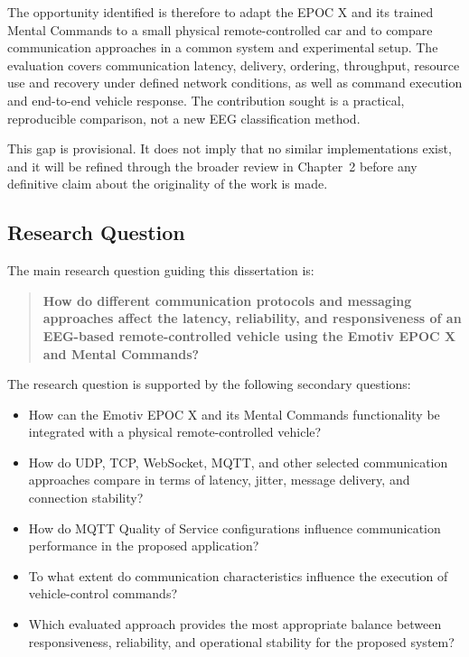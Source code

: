 The opportunity identified is therefore to adapt the EPOC X and its trained Mental Commands to a small physical remote-controlled car and to compare communication approaches in a common system and experimental setup. The evaluation covers communication latency, delivery, ordering, throughput, resource use and recovery under defined network conditions, as well as command execution and end-to-end vehicle response. The contribution sought is a practical, reproducible comparison, not a new EEG classification method.

This gap is provisional. It does not imply that no similar implementations exist, and it will be refined through the broader review in Chapter~2 before any definitive claim about the originality of the work is made.

\subsection{Research Question}

The main research question guiding this dissertation is:

\begin{quote}
\textbf{How do different communication protocols and messaging approaches affect the latency, reliability, and responsiveness of an EEG-based remote-controlled vehicle using the Emotiv EPOC X and Mental Commands?}
\end{quote}

The research question is supported by the following secondary questions:

\begin{itemize}
  \item How can the Emotiv EPOC X and its Mental Commands functionality be integrated with a physical remote-controlled vehicle?
  \item How do UDP, TCP, WebSocket, MQTT, and other selected communication approaches compare in terms of latency, jitter, message delivery, and connection stability?
  \item How do MQTT Quality of Service configurations influence communication performance in the proposed application?
  \item To what extent do communication characteristics influence the execution of vehicle-control commands?
  \item Which evaluated approach provides the most appropriate balance between responsiveness, reliability, and operational stability for the proposed system?
\end{itemize}

